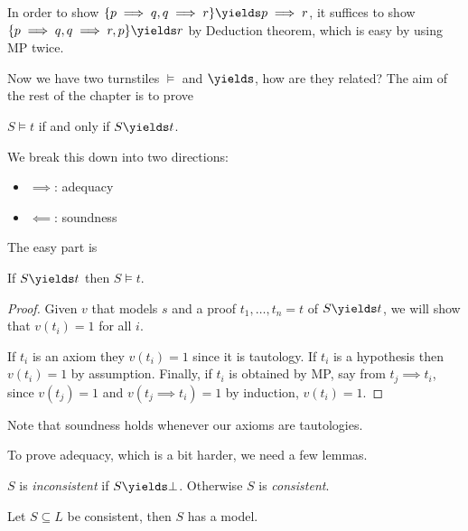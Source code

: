 \documentclass[a4paper]{article}
\begin{document}
\begin{eg}
  In order to show \(\{p \implies q, q \implies r\} \yields p \implies r\), it suffices to show \(\{p \implies q, q \implies r, p\} \yields r\) by Deduction theorem, which is easy by using MP twice.
\end{eg}

Now we have two turnstiles \(\models\) and \(\yields\), how are they related? The aim of the rest of the chapter is to prove

\begin{theorem}
  \(S \models t\) if and only if \(S \yields t\).
\end{theorem}

We break this down into two directions:
\begin{itemize}
\item \(\implies\): adequacy
\item \(\impliedby\): soundness
\end{itemize}

The easy part is

\begin{proposition}[Soundness]
  If \(S \yields t\) then \(S \models t\).
\end{proposition}

\begin{proof}
  Given \(v\) that models \(s\) and a proof \(t_1, \dots, t_n = t\) of \(S \yields t\), we will show that \(v(t_i) = 1\) for all \(i\).

  If \(t_i\) is an axiom they \(v(t_i) = 1\) since it is tautology. If \(t_i\) is a hypothesis then \(v(t_i) = 1\) by assumption. Finally, if \(t_i\) is obtained by MP, say from \(t_j \implies t_i\), since \(v(t_j) = 1\) and \(v(t_j \implies t_i) = 1\) by induction, \(v(t_i) = 1\).
\end{proof}

Note that soundness holds whenever our axioms are tautologies.

To prove adequacy, which is a bit harder, we need a few lemmas.

\begin{definition}[Consistency]
  \(S\) is \emph{inconsistent} if \(S \yields \bot\). Otherwise \(S\) is \emph{consistent}.
\end{definition}

\begin{theorem}
  Let \(S \subseteq L\) be consistent, then \(S\) has a model.
\end{theorem}
\end{document}
